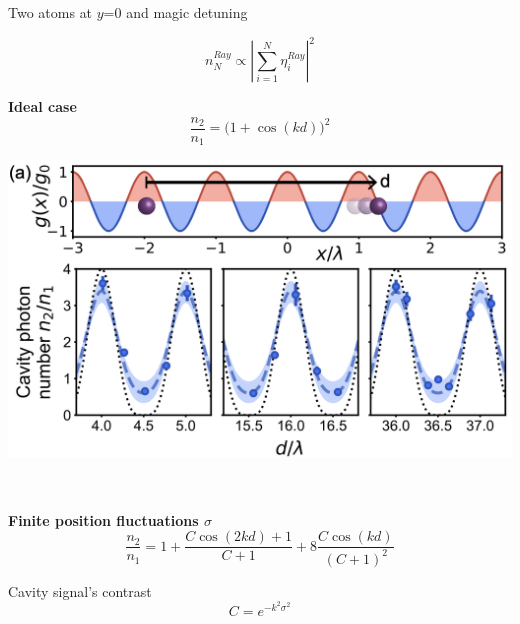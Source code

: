 \documentclass{beamer}
\begin{document}
\begin{frame}{Two atoms {\tiny at $y$=0 and magic detuning}}
	\begin{minipage}{\textwidth}
		\begin{minipage}{0.3\textwidth}
			\begin{equation*}
				n^{Ray}_N \propto |\sum_{i=1}^N \eta^{Ray}_i|^2
			\end{equation*}
			\vspace{1em}
			\begin{minipage}{\textwidth}
				\textbf{Ideal case}
				\vspace{-0.5em}
				\begin{equation*}
					\frac{n_2}{n_1} = \bigl(1+\cos(kd)\bigr)^2
				\end{equation*}
			\end{minipage}
			\vspace{0.8em}
		\end{minipage}
		\hfill
		\begin{minipage}{0.6\textwidth}
			\centering
			\includegraphics[width=\textwidth]{Figure_2a.png}
		\end{minipage}
	\end{minipage}\\
	\vfill
	\begin{minipage}{0.6\textwidth}		
		\textbf{Finite position fluctuations $\sigma$}
		\vspace{-0.5em}
		\begin{equation*}
			\frac{n_2}{n_1} = 1+\frac{C\cos(2kd)+1}{C+1}+8\frac{C\cos(kd)}{(C+1)^2}
		\end{equation*}
	\end{minipage}
	\hfill
	\begin{minipage}{0.35\textwidth}
		\vspace{1.4em}
		Cavity signal's contrast
		\vspace{-1em}
		\begin{equation*}
			C = e^{-k^2\sigma^2}
		\end{equation*}
	\end{minipage}
\end{frame}
\end{document}
